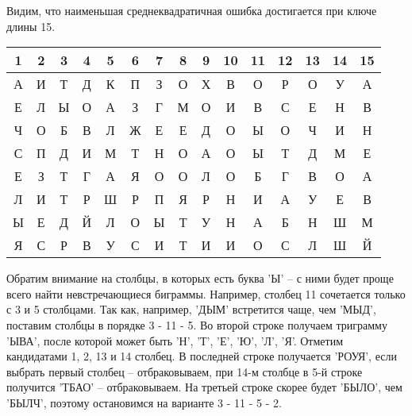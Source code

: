 \documentclass[letterpaper,11pt,openany]{book}
\begin{document}
Видим, что наименьшая среднеквадратичная ошибка достигается при ключе длины 15.

{\centering
\begin{tabular}{||c|c|c|c|c|c|c|c|c|c|c|c|c|c|c||}
\hline
1 & 2 & 3 & 4 & 5 & 6 & 7 & 8 & 9 & 10 & 11 & 12 & 13 & 14 & 15 \\
\hline
А & И & Т & Д & К & П & З & О & Х & В & О & Р & О & У & А \\
\hline
Е & Л & Ы & О & А & З & Г & М & О & И & В & С & Е & Н & В \\
\hline
Ч & О & Б & В & Л & Ж & Е & Е & Д & О & Ы & О & Ч & И & Н \\
\hline
С & П & Д & И & М & Т & Н & О & А & О & Ы & Т & Д & М & Е \\
\hline
Е & З & Т & Г & А & Я & О & О & Л & О & Б & Г & В & О & А \\
\hline
Л & И & Т & Р & Ш & Р & П & Я & Р & Н & И & А & У & Е & В \\
\hline
Ы & Е & Д & Й & Л & О & Ы & Т & У & Н & А & Б & Н & Ш & М \\
\hline
Я & С & Р & В & У & С & И & Т & И & И & О & С & Л & Ш & Й \\
\hline
\end{tabular}

}
\medskip

Обратим внимание на столбцы, в которых есть буква 'Ы' -- с ними будет проще всего найти невстречающиеся биграммы. Например, столбец 11 сочетается только с 3 и 5 столбцами. Так как, например, 'ДЫМ' встретится чаще, чем 'МЫД', поставим столбцы в порядке 3 - 11 - 5. Во второй строке получаем триграмму 'ЫВА', после которой может быть 'Н', 'Т', 'Е', 'Ю', 'Л', 'Я'. Отметим кандидатами 1, 2, 13 и 14 столбец. В последней строке получается 'РОУЯ', если выбрать первый столбец -- отбраковываем, при 14-м столбце в 5-й строке получится 'ТБАО' -- отбраковываем. На третьей строке скорее будет 'БЫЛО', чем 'БЫЛЧ', поэтому остановимся на варианте 3 - 11 - 5 - 2.

\medskip
\end{document}
